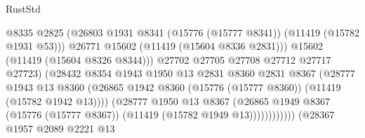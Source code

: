 \begin{lexlean}{RustStd}
\begin{coremodule}
                                              @8335
                                              @2825
                                              (@26803
                                                @1931
                                                @8341
                                                (@15776 (@15777 @8341))
                                                (@11419 (@15782 @1931 @53)))
                                              @26771
                                              @15602
                                              (@11419 (@15604 @8336 @2831)))
                                            @15602
                                            (@11419 (@15604 @8326 @8344)))
                                          @27702
                                          @27705
                                          @27708
                                          @27712
                                          @27717
                                          @27723)
                                        (@28432
                                          @8354
                                          @1943
                                          @1950
                                          @13
                                          @2831
                                          @8360
                                          @2831
                                          @8367
                                          (@28777
                                            @1943
                                            @13
                                            @8360
                                            (@26865
                                              @1942
                                              @8360
                                              (@15776 (@15777 @8360))
                                              (@11419 (@15782 @1942 @13))))
                                          (@28777
                                            @1950
                                            @13
                                            @8367
                                            (@26865
                                              @1949
                                              @8367
                                              (@15776 (@15777 @8367))
                                              (@11419 (@15782 @1949 @13))))))))))))
                          (@28367
                            @1957
                            @2089
                            @2221
                            @13

\end{coremodule}
\end{lexlean}
